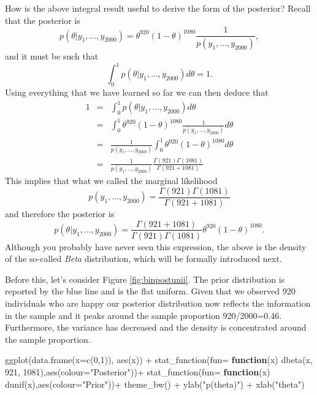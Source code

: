 \documentclass[
]{book}
\newenvironment{Shaded}{\begin{snugshade}}{\end{snugshade}}
\newcommand{\AttributeTok}[1]{\textcolor[rgb]{0.77,0.63,0.00}{#1}}
\newcommand{\ControlFlowTok}[1]{\textcolor[rgb]{0.13,0.29,0.53}{\textbf{#1}}}
\newcommand{\DecValTok}[1]{\textcolor[rgb]{0.00,0.00,0.81}{#1}}
\newcommand{\FunctionTok}[1]{\textcolor[rgb]{0.00,0.00,0.00}{#1}}
\newcommand{\NormalTok}[1]{#1}
\newcommand{\SpecialCharTok}[1]{\textcolor[rgb]{0.00,0.00,0.00}{#1}}
\newcommand{\StringTok}[1]{\textcolor[rgb]{0.31,0.60,0.02}{#1}}
\begin{document}
How is the above integral result useful to derive the form of the posterior? Recall that the posterior is
\[
p(\theta|y_1,\dots,y_{2000}) = \theta^{920}(1-\theta)^{1080}\frac{1}{p(y_1,\dots,y_{2000})},
\]
and it must be such that
\[
\int_0^1p(\theta|y_1,\dots,y_{2000})d\theta = 1. 
\]
Using everything that we have learned so far we can then deduce that
\begin{eqnarray*}
1 & = & \int_0^1p(\theta|y_1,\dots,y_{2000})d\theta \\
& = &  \int_0^1 \theta^{920}(1-\theta)^{1080}\frac{1}{p(y_1,\dots,y_{2000})}d\theta\\
& = &\frac{1}{p(y_1,\dots,y_{2000})} \int_0^1 \theta^{920}(1-\theta)^{1080}d\theta\\
&= & \frac{1}{p(y_1,\dots,y_{2000})} \frac{\Gamma(921)\Gamma(1081)}{\Gamma(921 + 1081)}
\end{eqnarray*}
This implies that what we called the marginal likelihood
\[
p(y_1,\dots,y_{2000})=\frac{\Gamma(921)\Gamma(1081)}{\Gamma(921 + 1081)}
\]
and therefore the posterior is
\[
p(\theta|y_1,\dots,y_{2000}) = \frac{\Gamma(921 + 1081)}{\Gamma(921)\Gamma(1081)}\theta^{920}(1-\theta)^{1080}.
\]
Although you probably have never seen this expression, the above is the density of the so-called \emph{Beta} distribution, which will be formally introduced next.

Before this, let's consider Figure \ref{fig:binpostunii}. The prior distribution is reported by the blue line and is the flat uniform. Given that we observed 920 individuals who are happy our posterior distribution now reflects the information in the sample and it peaks around the sample proportion 920/2000=0.46. Furthermore, the variance has decreased and the density is concentrated around the sample proportion.

\begin{Shaded}
\begin{Highlighting}[]
\FunctionTok{ggplot}\NormalTok{(}\FunctionTok{data.frame}\NormalTok{(}\AttributeTok{x=}\FunctionTok{c}\NormalTok{(}\DecValTok{0}\NormalTok{,}\DecValTok{1}\NormalTok{)), }\FunctionTok{aes}\NormalTok{(x)) }\SpecialCharTok{+}
  \FunctionTok{stat\_function}\NormalTok{(}\AttributeTok{fun=} \ControlFlowTok{function}\NormalTok{(x) }\FunctionTok{dbeta}\NormalTok{(x, }\DecValTok{921}\NormalTok{, }\DecValTok{1081}\NormalTok{),}\FunctionTok{aes}\NormalTok{(}\AttributeTok{colour=}\StringTok{"Posterior"}\NormalTok{))}\SpecialCharTok{+}
   \FunctionTok{stat\_function}\NormalTok{(}\AttributeTok{fun=} \ControlFlowTok{function}\NormalTok{(x) }\FunctionTok{dunif}\NormalTok{(x),}\FunctionTok{aes}\NormalTok{(}\AttributeTok{colour=}\StringTok{"Prior"}\NormalTok{))}\SpecialCharTok{+}
  \FunctionTok{theme\_bw}\NormalTok{() }\SpecialCharTok{+} \FunctionTok{ylab}\NormalTok{(}\StringTok{"p(theta)"}\NormalTok{) }\SpecialCharTok{+} \FunctionTok{xlab}\NormalTok{(}\StringTok{"theta"}\NormalTok{)}
\end{Highlighting}
\end{Shaded}
\end{document}
